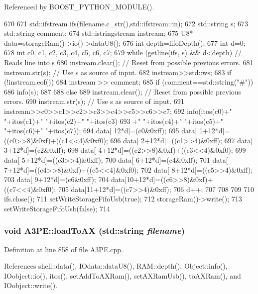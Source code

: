 Referenced by BOOST\_\-PYTHON\_\-MODULE().


\begin{DoxyCode}
670                                         {
671   std::ifstream ifs(filename.c_str(),std::ifstream::in);
672   std::string s;
673   std::string comment;
674   std::istringstream instream;
675   U8* data=storageRam()->io()->dataU8();
676   int depth=fifoDepth();
677   int d=0;
678   int c0, c1, c2, c3, c4, c5, c6, c7;
679   while (getline(ifs, s) && d<depth) { // Reads line into s
680       instream.clear();     // Reset from possible previous errors.
681       instream.str(s);      // Use s as source of input.
682       instream>>std::ws;
683       if (!instream.eof()) {
684         instream >> comment;
685         if (comment==std::string("#")) {
686           info(s);
687         }
688         else {
689           instream.clear();     // Reset from possible previous errors.
690           instream.str(s);      // Use s as source of input.
691           instream>>c0>>c1>>c2>>c3>>c4>>c5>>c6>>c7;
692           info(itos(c0)+" "+itos(c1)+" "+itos(c2)+" "+itos(c3)
693               +" "+itos(c4)+" "+itos(c5)+" "+itos(c6)+" "+itos(c7));
694           data[   12*d]=(c0&0xff);
695           data[ 1+12*d]=((c0>>8)&0xf)+((c1<<4)&0xf0);
696           data[ 2+12*d]=((c1>>4)&0xff);
697           data[ 3+12*d]=(c2&0xff);
698           data[ 4+12*d]=((c2>>8)&0xf)+((c3<<4)&0xf0);
699           data[ 5+12*d]=((c3>>4)&0xff);
700           data[ 6+12*d]=(c4&0xff);
701           data[ 7+12*d]=((c4>>8)&0xf)+((c5<<4)&0xf0);
702           data[ 8+12*d]=((c5>>4)&0xff);
703           data[ 9+12*d]=(c6&0xff);
704           data[10+12*d]=((c6>>8)&0xf)+((c7<<4)&0xf0);
705           data[11+12*d]=((c7>>4)&0xff);
706           d++;
707         }
708       }
709   }
710   ifs.close();
711   setWriteStorageFifoUsb(true);
712   storageRam()->write();
713   setWriteStorageFifoUsb(false);
714 }
\end{DoxyCode}
\hypertarget{classA3PE_a40017b4138705690f8b04e336a7ffcdf}{
\subsubsection[{loadToAX}]{\setlength{\rightskip}{0pt plus 5cm}void A3PE::loadToAX (std::string {\em filename})}}
\label{classA3PE_a40017b4138705690f8b04e336a7ffcdf}


Definition at line 858 of file A3PE.cpp.

References shell::data(), IOdata::dataU8(), RAM::depth(), Object::info(), IOobject::io(), itos(), setAddToAXRam(), setAXRamUsb(), toAXRam(), and IOobject::write().

